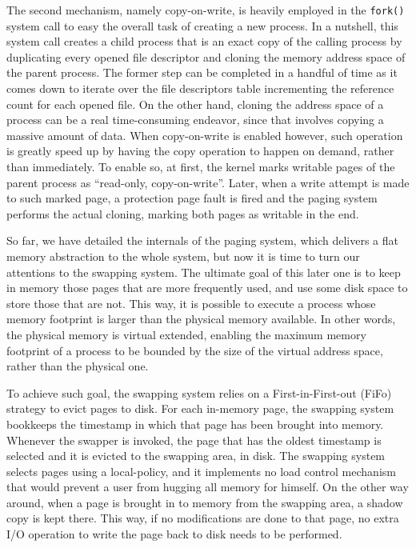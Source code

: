 \documentclass[10pt,a4paper]{article}
\begin{document}
The second mechanism, namely copy-on-write, is heavily employed in the \texttt{fork()} system call to easy the overall task of creating a new process. In a nutshell, this system call creates a child process that is an exact copy of the calling process by duplicating every opened file descriptor and cloning the memory address space of the parent process. The former step can be completed in a handful of time as it comes down to iterate over the file descriptors table incrementing the reference count for each opened file. On the other hand, cloning the address space of a process can be a real time-consuming endeavor, since that involves copying a massive amount of data. When copy-on-write is enabled however, such operation is greatly speed up by having the copy operation to happen on demand, rather than immediately. To enable so, at first, the kernel marks writable pages of the parent process as ``read-only, copy-on-write''. Later, when a write attempt is made to such marked page, a protection page fault is fired and the paging system performs the actual cloning, marking both pages as writable in the end.

So far, we have detailed the internals of the paging system, which delivers a flat memory abstraction to the whole system, but now it is time to turn our attentions to the swapping system. The ultimate goal of this later one is to keep in memory those pages that are more frequently used, and use some disk space to store those that are not. This way, it is possible to execute a process whose memory footprint is larger than the physical memory available. In other words, the physical memory is virtual extended, enabling the maximum memory footprint of a process to be bounded by the size of the virtual address space, rather than the physical one.

To achieve such goal, the swapping system relies on a First-in-First-out (FiFo) strategy to evict pages to disk. For each in-memory page, the swapping system bookkeeps the timestamp in which that page has been brought into memory. Whenever the swapper is invoked, the page that has the oldest timestamp is selected and it is evicted to the swapping area, in disk. The swapping system selects pages using a local-policy, and it implements no load control mechanism that would prevent a user from hugging all memory for himself. On the other way around, when a page is brought in to memory from the swapping area, a shadow copy is kept there. This way, if no modifications are done to that page, no extra I/O operation to write the page back to disk needs to be performed.
\end{document}
